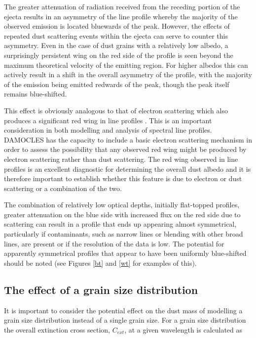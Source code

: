 The greater attenuation of radiation received from the receding portion of 
the ejecta results in an asymmetry of the line profile whereby the 
majority of the observed emission is located bluewards of the peak.  
However, the effects of repeated dust scattering events within the 
ejecta can serve to counter this asymmetry.  Even in the case of dust grains 
with a relatively low albedo, a surprisingly persistent wing on the red 
side of the profile is seen beyond the maximum theoretical velocity 
of the emitting region.  For higher albedos this can actively result in a 
shift in the overall asymmetry of the profile, with the majority of the 
emission being emitted redwards of the peak, though the peak itself 
remains blue-shifted.

This effect is obviously analogous to that of electron scattering which 
also produces a significant red wing in line profiles \citep{Hillier1991, 
Auer1972}. This is an important consideration in both modelling and 
analysis of spectral line profiles.  DAMOCLES has the capacity to include 
a basic electron scattering mechanism in order to assess the possibility 
that any observed red wing might be produced by electron scattering rather 
than dust scattering.  The red wing observed in line profiles is an 
excellent diagnostic for determining the overall dust albedo and it is 
therefore important to establish whether this feature is due to 
electron or dust scattering or a combination of the two.

The combination of relatively low optical depths, initially flat-topped 
profiles, greater attenuation on the blue side with increased flux on the 
red side due to scattering can result in a profile that ends up appearing 
almost symmetrical, particularly if 
contaminants, such as narrow lines or blending with other broad lines, are 
present or if the resolution of the data is low.  The potential for apparently 
symmetrical profiles that appear to have been uniformly blue-shifted 
should be noted (see Figures \ref{bt} and \ref{wt} for examples of this).



\subsection{The effect of a grain size distribution}
\label{gs_distn}
It is important to consider the potential effect on the dust mass of modelling a grain size distribution instead of a single grain size.  For a grain size distribution the overall extinction cross section, $C_{ext}$, at a given wavelength is calculated as

